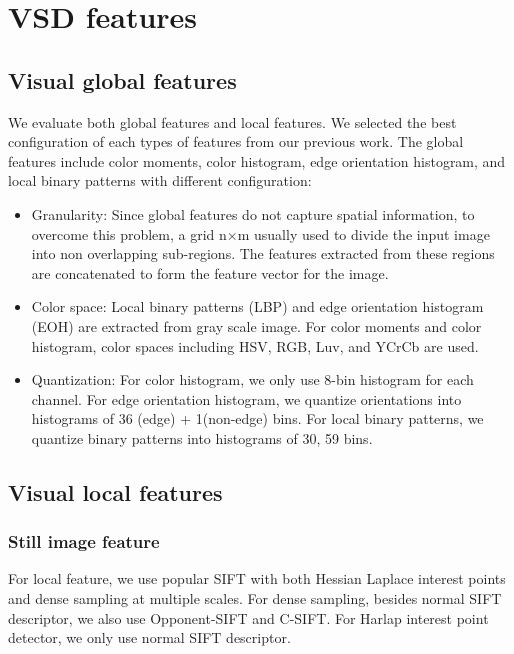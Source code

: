 \documentclass[review]{elsarticle}
\begin{document}
\section{VSD features}
\label{vsd_feature}

\subsection{Visual global features}

We evaluate both global features and local features. We selected the best configuration of each types of features from our previous work\cite{lam2012nii}. The global features include color moments, color histogram, edge orientation histogram, and local binary patterns with different configuration:

\begin{itemize}
	\item Granularity:  Since global features do not capture spatial information, to overcome this problem, a grid n×m usually used to divide the input image into non overlapping sub-regions. The features extracted from these regions are concatenated to form the feature vector for the image.
	\item Color space: Local binary patterns (LBP) and edge orientation histogram (EOH) are extracted from gray scale image. For color moments and color histogram, color spaces including HSV, RGB, Luv, and YCrCb are used.
	\item Quantization: For color histogram, we only use 8-bin histogram for each channel. For edge orientation histogram, we quantize orientations into histograms of 36 (edge) + 1(non-edge) bins. For local binary patterns, we quantize binary patterns into histograms of 30, 59 bins.
\end{itemize}

\subsection{Visual local features}
\subsubsection{Still image feature}

For local feature, we use popular SIFT with both Hessian Laplace interest points and dense sampling at multiple scales. For dense sampling, besides normal SIFT descriptor, we also use Opponent-SIFT and C-SIFT. For Harlap interest point detector, we only use normal SIFT descriptor.	
\end{document}
